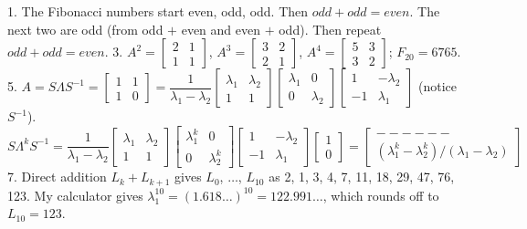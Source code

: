 1. The Fibonacci numbers start even, odd, odd. Then \(odd+odd=even\). The next two are odd (from odd \(+\) even and even \(+\) odd). Then repeat \(odd+odd=even\).
3. \(A^{2}=\begin{bmatrix}2&1\\ 1&1\end{bmatrix}\), \(A^{3}=\begin{bmatrix}3&2\\ 2&1\end{bmatrix}\), \(A^{4}=\begin{bmatrix}5&3\\ 3&2\end{bmatrix}\); \(F_{20}=6765\).
5. \(A=S\Lambda S^{-1}=\begin{bmatrix}1&1\\ 1&0\end{bmatrix}=\dfrac{1}{\lambda_{1}-\lambda_{2}}\begin{bmatrix}\lambda_{1}& \lambda_{2}\\ 1&1\end{bmatrix}\begin{bmatrix}\lambda_{1}&0\\ 0&\lambda_{2}\end{bmatrix}\begin{bmatrix}1&-\lambda_{2}\\ -1&\lambda_{1}\end{bmatrix}\) (notice \(S^{-1}\)). \(S\Lambda^{k}S^{-1}=\dfrac{1}{\lambda_{1}-\lambda_{2}}\begin{bmatrix}\lambda_ {1}&\lambda_{2}\\ 1&1\end{bmatrix}\begin{bmatrix}\lambda_{1}^{k}&0\\ 0&\lambda_{2}^{k}\end{bmatrix}\begin{bmatrix}1&-\lambda_{2}\\ -1&\lambda_{1}\end{bmatrix}\begin{bmatrix}1\\ 0\end{bmatrix}=\begin{bmatrix}------\\ (\lambda_{1}^{k}-\lambda_{2}^{k})/(\lambda_{1}-\lambda_{2})\end{bmatrix}\)
7. Direct addition \(L_{k}+L_{k+1}\) gives \(L_{0}\), \(\ldots\), \(L_{10}\) as 2, 1, 3, 4, 7, 11, 18, 29, 47, 76, 123. My calculator gives \(\lambda_{1}^{10}=(1.618\ldots)^{10}=122.991\ldots\), which rounds off to \(L_{10}=123\).
